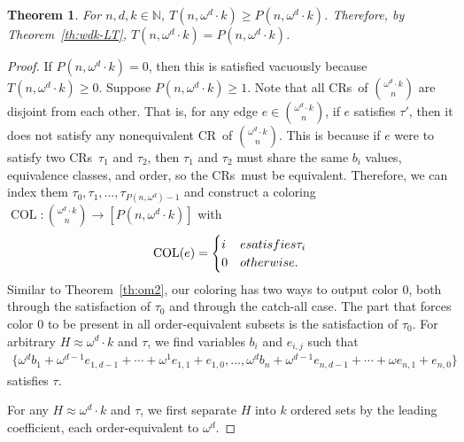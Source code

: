\documentclass[11pt]{article}
\newcommand{\om}{\omega}
\newcommand{\oequiv}{\approx}
\newcommand{\COL}{\operatorname{COL}}
\newcommand{\N}{\mathbb{N}}
\newcommand{\crulenospace}{CR}
\newcommand{\crule}{\crulenospace~}
\newcommand{\crules}{\crulenospace s~}
\newcommand{\numpoints}{n}
\newcommand{\inumpoints}{i}
\newcommand{\idegr}{j}
\newcommand{\rareconst}{b}
\theoremstyle{plain}
\newtheorem{theorem}{Theorem}[section]
\theoremstyle{definition}
\begin{document}
\begin{theorem}\label{th:wdk-GT}
For $\numpoints,d,k \in \N$, $T\left(\numpoints,\om^d \cdot k\right) \geq P\left(\numpoints,\om^d \cdot k\right)$.
Therefore, by Theorem~\ref{th:wdk-LT}, \linebreak $T(\numpoints,\om^d \cdot k) = P(\numpoints,\om^d \cdot k)$.
\end{theorem}
\begin{proof}
If $P(\numpoints,\om^d \cdot k) = 0$, then this is satisfied vacuously because $T(\numpoints, \om^d \cdot k) \geq 0$. Suppose $P(\numpoints,\om^d \cdot k) \geq 1$. Note that all \crules of $\binom{\om^d \cdot k}{\numpoints}$ are disjoint from each other. That is, for any edge $e \in \binom{\om^d \cdot k}{\numpoints}$, if $e$ satisfies $\tau'$, then it does not satisfy any nonequivalent \crule of $\binom{\om^d \cdot k}{\numpoints}$. This is because if $e$ were to satisfy two \crules $\tau_1$ and $\tau_2$, then $\tau_1$ and $\tau_2$ must share the same $\rareconst_{\inumpoints}$ values, equivalence classes, and order, so the \crules must be equivalent. Therefore, we can index them $\tau_0, \tau_1, \ldots, \tau_{P(\numpoints, \om^d)-1}$ and construct a coloring $\COL \colon \binom{\om^d \cdot k}{\numpoints} \to [P(\numpoints, \om^d\cdot k)]$ with \begin{align*}
    \COL(e) = \begin{cases}
    i & e \textnormal{ satisfies } \tau_i\\
    0 & \textnormal{otherwise}.
    \end{cases}
\end{align*}
Similar to Theorem~\ref{th:om2}, our coloring has two ways to output color 0, both 
through the satisfaction of $\tau_0$ and through the catch-all case. The part that forces 
color 0 to be present in all order-equivalent subsets is the satisfaction of $\tau_0$.
For arbitrary $H \oequiv \om^{d}\cdot k$ and $\tau$, we find variables $\rareconst_{\inumpoints}$ and $e_{\inumpoints,\idegr}$ such that
\begin{align*}
    \{\om^d \rareconst_1 + \om^{d-1} e_{1,d-1} + \cdots + \om^{1} e_{1,1} + e_{1,0}, \ldots,
    \om^d \rareconst_{\numpoints} + \om^{d-1} e_{\numpoints,d-1} + \cdots + \om e_{\numpoints,1} + e_{\numpoints,0}\}
\end{align*}
satisfies $\tau$.

For any $H \oequiv \om^{d}\cdot k$ and $\tau$, we first separate $H$ 
into $k$ ordered sets by the leading coefficient, each order-equivalent to $\om^d$.


\end{proof}
\end{document}
